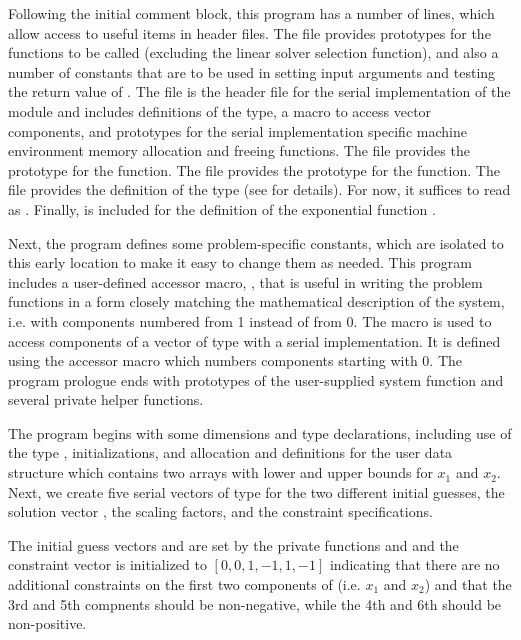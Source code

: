 Following the initial comment block, this program has a number
of  lines, which allow access to useful items in {\cvode}
header files. 
The  file provides prototypes for the {\kinsol}
functions to be called (excluding the linear solver selection
function), and also a number of constants that are to be used in
setting input arguments and testing the return value of .
The  file is the header file for the serial
implementation of the {\nvector} module and includes definitions of the 
 type, a macro to access vector components, and prototypes 
for the serial implementation specific machine environment memory allocation
and freeing functions.
The  file provides the prototype for the  function.
The  file provides the prototype for the  function.
The  file provides the definition of the
type  (see  for details).  
For now, it suffices to read  as .
Finally,  is included for the definition of the
exponential function .

Next, the program defines some problem-specific constants, which are
isolated to this early location to make it easy to change them as needed.  
This program includes a user-defined accessor macro, , that
is useful in writing the problem functions in a form closely matching 
the mathematical description of the system, i.e. with components numbered 
from 1 instead of from 0. The  macro is used to access components 
of a vector of type  with a serial implementation.  
It is defined using the {\nvecs} accessor macro  which 
numbers components starting with 0.
The program prologue ends with prototypes of the user-supplied system function 
 and several private helper functions.

The  program begins with some dimensions and type declarations,
including use of the type , initializations, and allocation
and definitions for the user data structure  which contains two
arrays with lower and upper bounds for $x_1$ and $x_2$. Next, we create five
serial vectors of type  for the two different initial guesses,
the solution vector , the scaling factors, and the constraint specifications.

The initial guess vectors  and  are set by the private
functions  and  and the constraint
vector  is initialized to $[0,0,1,-1,1,-1]$ indicating that there are
no additional constraints on the first two components of  (i.e. $x_1$ and 
$x_2$) and that the 3rd and 5th compnents should be non-negative, while
the 4th and 6th should be non-positive.

